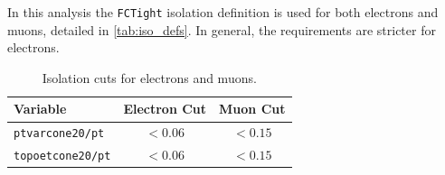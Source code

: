 In this analysis the \texttt{FCTight} isolation definition is used for both electrons and muons, detailed in \autoref{tab:iso_defs}. In general, the requirements are stricter for electrons. 


\begin{table}
\centering
\begin{tabular}{lcc}
Variable & Electron Cut & Muon Cut  \\
\hline
\texttt{ptvarcone20/pt}  & $< 0.06$   & $ < 0.15$ \\
\texttt{topoetcone20/pt} &  $< 0.06$   & $ < 0.15$\\
\hline
\end{tabular}
\caption{Isolation cuts for electrons and muons.}
\label{tab:iso_defs}
\end{table}






